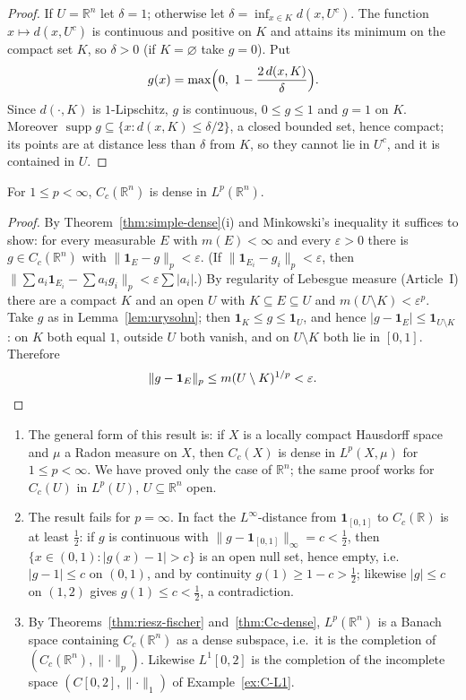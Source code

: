 \documentclass[11pt]{article}
\newcommand{\R}{\mathbb{R}}
\newcommand{\norm}[1]{\lVert #1\rVert}
\newcommand{\ind}{\mathbf{1}}
\DeclareMathOperator{\supp}{supp}
\begin{document}
\begin{proof}
If $U=\R^{n}$ let $\delta=1$; otherwise let $\delta=\inf_{x\in K}d(x,U^{c})$. The function $x\mapsto d(x,U^{c})$ is continuous and positive on $K$ and attains its minimum on the compact set $K$, so $\delta>0$ (if $K=\varnothing$ take $g=0$). Put
\[
g(x)=\max\Bigl(0,\ 1-\frac{2\,d(x,K)}{\delta}\Bigr).
\]
Since $d(\cdot,K)$ is $1$-Lipschitz, $g$ is continuous, $0\le g\le1$ and $g=1$ on $K$. Moreover $\supp g\subseteq\{x:d(x,K)\le\delta/2\}$, a closed bounded set, hence compact; its points are at distance less than $\delta$ from $K$, so they cannot lie in $U^{c}$, and it is contained in $U$.
\end{proof}

\begin{theorem}\label{thm:Cc-dense}
For $1\le p<\infty$, $C_{c}(\R^{n})$ is dense in $L^{p}(\R^{n})$.
\end{theorem}

\begin{proof}
By Theorem~\ref{thm:simple-dense}(i) and Minkowski's inequality it suffices to show: for every measurable $E$ with $m(E)<\infty$ and every $\varepsilon>0$ there is $g\in C_{c}(\R^{n})$ with $\norm{\ind_{E}-g}_{p}<\varepsilon$. (If $\norm{\ind_{E_{i}}-g_{i}}_{p}<\varepsilon$, then $\norm{\sum a_{i}\ind_{E_{i}}-\sum a_{i}g_{i}}_{p}<\varepsilon\sum|a_{i}|$.) By regularity of Lebesgue measure (Article~I) there are a compact $K$ and an open $U$ with $K\subseteq E\subseteq U$ and $m(U\setminus K)<\varepsilon^{p}$. Take $g$ as in Lemma~\ref{lem:urysohn}; then $\ind_{K}\le g\le\ind_{U}$, and hence $|g-\ind_{E}|\le\ind_{U\setminus K}$: on $K$ both equal $1$, outside $U$ both vanish, and on $U\setminus K$ both lie in $[0,1]$. Therefore
\[
\norm{g-\ind_{E}}_{p}\le m(U\setminus K)^{1/p}<\varepsilon. \qedhere
\]
\end{proof}

\begin{remark}
\begin{enumerate}
\item The general form of this result is: if $X$ is a locally compact Hausdorff space and $\mu$ a Radon measure on $X$, then $C_{c}(X)$ is dense in $L^{p}(X,\mu)$ for $1\le p<\infty$. We have proved only the case of $\R^{n}$; the same proof works for $C_{c}(U)$ in $L^{p}(U)$, $U\subseteq\R^{n}$ open.
\item The result fails for $p=\infty$. In fact the $L^{\infty}$-distance from $\ind_{[0,1]}$ to $C_{c}(\R)$ is at least $\frac12$: if $g$ is continuous with $\norm{g-\ind_{[0,1]}}_{\infty}=c<\frac12$, then $\{x\in(0,1):|g(x)-1|>c\}$ is an open null set, hence empty, i.e.\ $|g-1|\le c$ on $(0,1)$, and by continuity $g(1)\ge1-c>\frac12$; likewise $|g|\le c$ on $(1,2)$ gives $g(1)\le c<\frac12$, a contradiction.
\item By Theorems~\ref{thm:riesz-fischer} and~\ref{thm:Cc-dense}, $L^{p}(\R^{n})$ is a Banach space containing $C_{c}(\R^{n})$ as a dense subspace, i.e.\ it is the completion of $(C_{c}(\R^{n}),\norm{\cdot}_{p})$. Likewise $L^{1}[0,2]$ is the completion of the incomplete space $(C[0,2],\norm{\cdot}_{1})$ of Example~\ref{ex:C-L1}.
\end{enumerate}
\end{remark}
\end{document}
